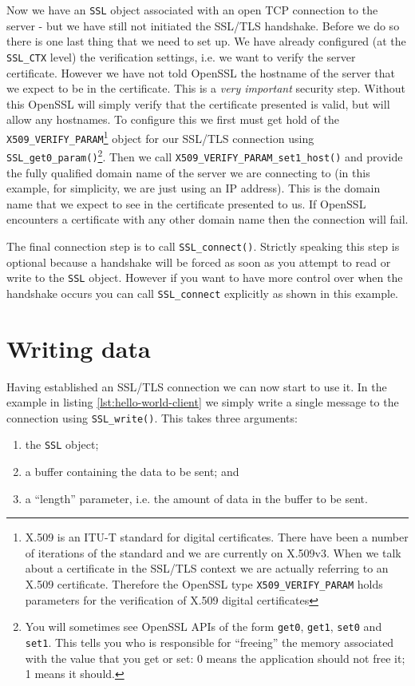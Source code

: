 Now we have an \verb!SSL! object associated with an open TCP connection to the 
server - but we have still not initiated the SSL/TLS handshake. Before we do so 
there is one last thing that we need to set up. We have already configured (at 
the \verb!SSL_CTX! level) the verification settings, i.e. we want to verify the 
server certificate. However we have not told OpenSSL the hostname of the server 
that we expect to be in the certificate. This is a \emph{very important} 
security step. Without this OpenSSL will simply verify that the certificate
presented is valid, but will allow any hostnames. To configure this we first 
must get hold of the \verb!X509_VERIFY_PARAM!\footnote{X.509 is an ITU-T 
standard for digital certificates. There have been a number of iterations of 
the standard and we are currently on X.509v3. When we talk about a certificate 
in the SSL/TLS context we are actually referring to an X.509 certificate. 
Therefore the OpenSSL type \texttt{X509\_VERIFY\_PARAM} holds parameters for the 
verification of X.509 digital certificates} object for our SSL/TLS connection 
using \verb!SSL_get0_param()!\footnote{You will sometimes see OpenSSL APIs of 
the form \texttt{get0}, \texttt{get1}, \texttt{set0} and \texttt{set1}. This
tells you  who is responsible for ``freeing'' the memory associated with the
value that  you get or set: 0 means the application should not free it; 1 means
it should.}. Then we call \verb!X509_VERIFY_PARAM_set1_host()! and provide the 
fully qualified domain name of the server we are connecting to (in this 
example, for simplicity, we are just using an IP address). This is the domain
name that  we expect to see in the certificate presented to us. If OpenSSL
encounters a certificate with any other domain name then the connection will
fail.

The final connection step is to call \verb!SSL_connect()!. Strictly speaking
this step is optional because a handshake will be forced as soon as you attempt
to read or write to the \verb!SSL! object. However if you want to have more 
control over when the handshake occurs you can call \verb!SSL_connect! 
explicitly as shown in this example.

\section{Writing data}

Having established an SSL/TLS connection we can now start to use it. In the 
example in listing \ref{lst:hello-world-client} we simply write a single 
message to the connection using \verb!SSL_write()!. This takes three arguments:
\begin{enumerate}
\item the \texttt{SSL} object;
\item a buffer containing the data to be sent; and
\item a ``length'' parameter, i.e. the amount of data in the buffer to be sent.
\end{enumerate}

